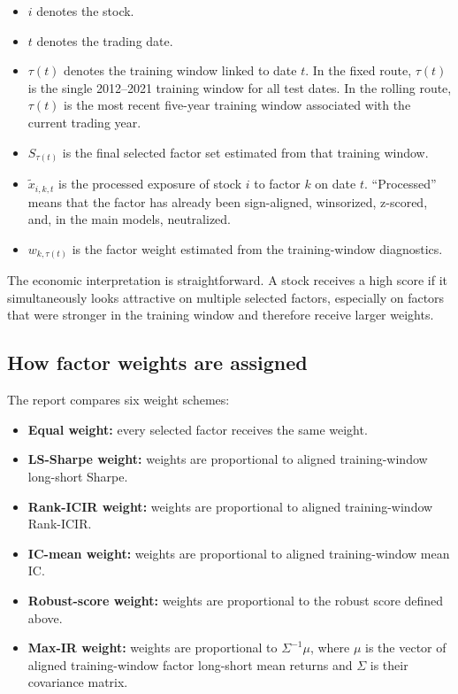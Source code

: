 \documentclass[11pt]{article}
\begin{document}
\begin{itemize}
    \item \(i\) denotes the stock.
    \item \(t\) denotes the trading date.
    \item \(\tau(t)\) denotes the training window linked to date \(t\). In the fixed route, \(\tau(t)\) is the single 2012--2021 training window for all test dates. In the rolling route, \(\tau(t)\) is the most recent five-year training window associated with the current trading year.
    \item \(S_{\tau(t)}\) is the final selected factor set estimated from that training window.
    \item \(\tilde{x}_{i,k,t}\) is the processed exposure of stock \(i\) to factor \(k\) on date \(t\). ``Processed'' means that the factor has already been sign-aligned, winsorized, z-scored, and, in the main models, neutralized.
    \item \(w_{k,\tau(t)}\) is the factor weight estimated from the training-window diagnostics.
\end{itemize}

The economic interpretation is straightforward. A stock receives a high score if it simultaneously looks attractive on multiple selected factors, especially on factors that were stronger in the training window and therefore receive larger weights.

\subsection{How factor weights are assigned}

The report compares six weight schemes:

\begin{itemize}
    \item \textbf{Equal weight:} every selected factor receives the same weight.
    \item \textbf{LS-Sharpe weight:} weights are proportional to aligned training-window long-short Sharpe.
    \item \textbf{Rank-ICIR weight:} weights are proportional to aligned training-window Rank-ICIR.
    \item \textbf{IC-mean weight:} weights are proportional to aligned training-window mean IC.
    \item \textbf{Robust-score weight:} weights are proportional to the robust score defined above.
    \item \textbf{Max-IR weight:} weights are proportional to \(\Sigma^{-1}\mu\), where \(\mu\) is the vector of aligned training-window factor long-short mean returns and \(\Sigma\) is their covariance matrix.
\end{itemize}
\end{document}
